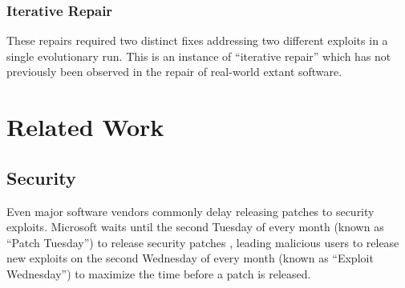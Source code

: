 \documentclass{sigcomm-alternate}
\begin{document}
{\subsubsection{Iterative Repair}
\label{iterative-repair}
These repairs required two distinct fixes addressing two different
exploits in a single evolutionary run.  This is an instance of
``iterative repair'' which has not previously been observed in the
repair of real-world extant software.


\section{Related Work}
\label{sec-5}
\subsection{Security}
\label{sec-5-1}

Even major software vendors commonly delay releasing patches to
security exploits.  Microsoft waits until the second Tuesday of every
month (known as ``Patch Tuesday'') to release security patches
\cite{lemos2003microsoft}, leading malicious users to release new
exploits on the second Wednesday of every month (known as ``Exploit
Wednesday'') to maximize the time before a patch is released.

}
\end{document}
